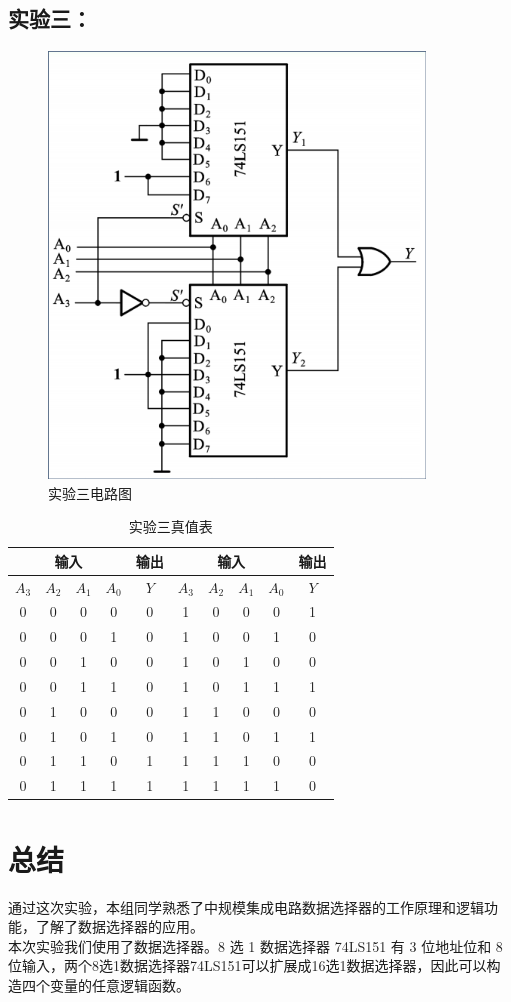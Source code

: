 \documentclass[a4paper,11pt,UTF8]{ctexart}
\begin{document}
 \subsection{实验三：\expc}
 
 \begin{figure}[H]
  \centering
  \includegraphics[width=10cm]{Exp02}
  \caption{实验三电路图}
  \label{fig:Exp03}
 \end{figure}

 \begin{table}[H]
  \centering
  \begin{tabular}{|cccc|c|cccc|c|}\hline
   \multicolumn{4}{|c|}{输入} &输出 
   &\multicolumn{4}{|c|}{输入} &输出
   \\\hline
   $A_3$ &$A_2$ &$A_1$ &$A_0$ &$Y$ &
   $A_3$ &$A_2$ &$A_1$ &$A_0$ &$Y$
   \\\hline
   0 &0 &0 &0	&0 &
   1 &0 &0 &0	&1\\
   0 &0 &0 &1	&0 &
   1 &0 &0 &1	&0\\
   0 &0 &1 &0	&0 &
   1 &0 &1 &0	&0\\
   0 &0 &1 &1	&0 &
   1 &0 &1 &1	&1\\
   0 &1 &0 &0	&0 &
   1 &1 &0 &0	&0\\
   0 &1 &0 &1	&0 &
   1 &1 &0 &1	&1\\
   0 &1 &1 &0	&1 &
   1 &1 &1 &0	&0\\
   0 &1 &1 &1	&1 &
   1 &1 &1 &1	&0
   \\\hline
  \end{tabular}
  \caption{实验三真值表}
  \label{tab:Exp03}
 \end{table}

  
 

\section{总结}
通过这次实验，本组同学熟悉了中规模集成电路数据选择器的工作原理和逻辑功能，了解了数据选择器的应用。
\\
本次实验我们使用了数据选择器。8 选 1 数据选择器 74LS151 有 3 位地址位和 8 位输入，两个8选1数据选择器74LS151可以扩展成16选1数据选择器，因此可以构造四个变量的任意逻辑函数。

 
\end{document}
